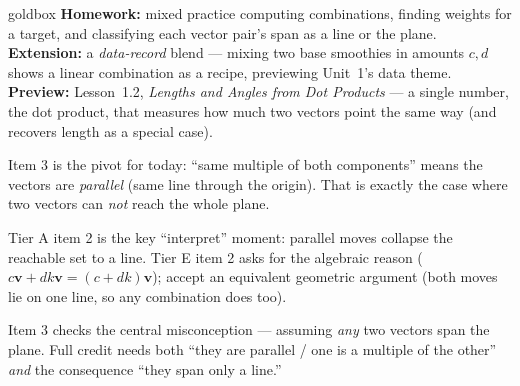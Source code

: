 \documentclass[10pt]{article}
\newcommand{\vv}{\mathbf{v}}
\begin{document}
\begin{skillbox}{goldbox}
\textbf{Homework:} mixed practice computing combinations, finding weights for a target, and
classifying each vector pair's span as a line or the plane. \textbf{Extension:} a
\emph{data-record} blend --- mixing two base smoothies in amounts $c,d$ shows a linear
combination as a recipe, previewing Unit~1's data theme. \textbf{Preview:} Lesson~1.2,
\emph{Lengths and Angles from Dot Products} --- a single number, the dot product, that measures
how much two vectors point the same way (and recovers length as a special case).
\end{skillbox}

\begin{teachernote}[Warm-Up]
Item 3 is the pivot for today: ``same multiple of both components'' means the vectors are
\emph{parallel} (same line through the origin). That is exactly the case where two vectors
can \emph{not} reach the whole plane.
\end{teachernote}

\begin{teachernote}
Tier A item 2 is the key ``interpret'' moment: parallel moves collapse the reachable set to a
line. Tier E item 2 asks for the algebraic reason ($c\vv+dk\vv=(c+dk)\vv$); accept an
equivalent geometric argument (both moves lie on one line, so any combination does too).
\end{teachernote}

\begin{teachernote}
Item 3 checks the central misconception --- assuming \emph{any} two vectors span the plane.
Full credit needs both ``they are parallel / one is a multiple of the other'' \emph{and} the
consequence ``they span only a line.''
\end{teachernote}
\end{document}
